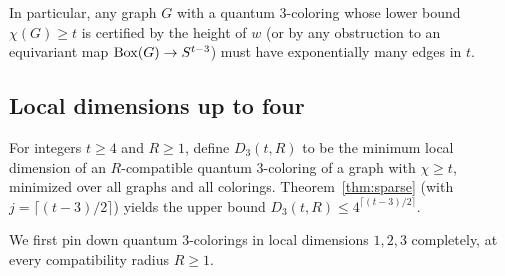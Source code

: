 In particular, any graph $G$ with a quantum $3$-coloring whose lower bound $\chi(G)\ge t$ is certified by the height of $w$ (or by any obstruction to an equivariant map $\operatorname{Box}(G)\to S^{t-3}$) must have exponentially many edges in $t$.

\subsection{Local dimensions up to four}\label{sec:alldim}

For integers $t\ge4$ and $R\ge1$, define $D_3(t,R)$ to be the minimum local dimension of an $R$-compatible quantum $3$-coloring of a graph with $\chi\ge t$, minimized over all graphs and all colorings. Theorem~\ref{thm:sparse} (with $j=\lceil(t-3)/2\rceil$) yields the upper bound $D_3(t,R)\le 4^{\lceil(t-3)/2\rceil}$.

We first pin down quantum $3$-colorings in local dimensions $1,2,3$ completely, at every compatibility radius $R\ge1$.

